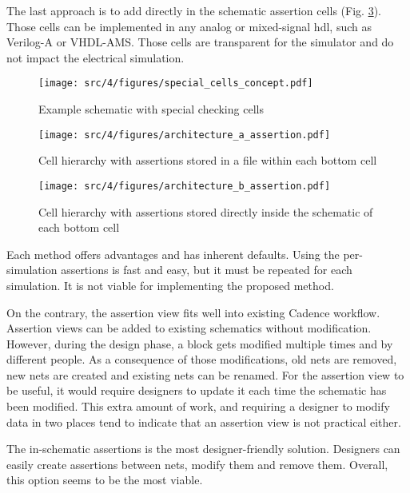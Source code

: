 The last approach is to add directly in the schematic assertion cells (Fig. \ref{fig:ex-special-cells}).
Those cells can be implemented in any analog or mixed-signal \gls{hdl}, such as Verilog-A or VHDL-AMS.
Those cells are transparent for the simulator and do not impact the electrical simulation.


\begin{figure}[!h]
  \centering
  \texttt{[image: src/4/figures/special\_cells\_concept.pdf]}
  \caption{Example schematic with special checking cells}
  \label{fig:ex-special-cells}
\end{figure}

\begin{figure}[!h]
  \centering
  \texttt{[image: src/4/figures/architecture\_a\_assertion.pdf]}
  \caption{Cell hierarchy with assertions stored in a file within each bottom cell}
  \label{fig:ex-special-cells}
\end{figure}

\begin{figure}[!h]
  \centering
  \texttt{[image: src/4/figures/architecture\_b\_assertion.pdf]}
  \caption{Cell hierarchy with assertions stored directly inside the schematic of each bottom cell}
  \label{fig:ex-special-cells}
\end{figure}


Each method offers advantages and has inherent defaults.
Using the per-simulation assertions is fast and easy, but it must be repeated for each simulation.
It is not viable for implementing the proposed method.

On the contrary, the assertion view fits well into existing Cadence workflow.
Assertion views can be added to existing schematics without modification.
However, during the design phase, a block gets modified multiple times and by different people.
As a consequence of those modifications, old nets are removed, new nets are created and existing nets can be renamed.
For the assertion view to be useful, it would require designers to update it each time the schematic has been modified.
This extra amount of work, and requiring a designer to modify data in two places tend to indicate that an assertion view is not practical either.

The in-schematic assertions is the most designer-friendly solution.
Designers can easily create assertions between nets, modify them and remove them.
Overall, this option seems to be the most viable.

